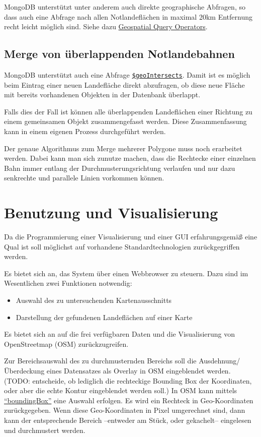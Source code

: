 \documentclass[
11pt, %
a4paper, %
oneside, %
pdfspacing, %
headinclude,
BCOR5mm, %
ngerman, %
bibtotocnumbered,
]{scrartcl}
\begin{document}
MongoDB unterstützt unter anderem auch direkte geographische Abfragen, so dass auch eine Abfrage nach allen Notlandeflächen in maximal 20km Entfernung recht leicht möglich sind. Siehe dazu \href{https://docs.mongodb.com/manual/reference/operator/query-geospatial/}{Geospatial Query Operators}.

\subsection{Merge von überlappenden Notlandebahnen}

MongoDB unterstützt auch eine Abfrage \href{https://docs.mongodb.com/manual/reference/operator/query/geoIntersects/#op._S_geoIntersects}{\texttt{\$geoIntersects}}. Damit ist es möglich beim Eintrag einer neuen Landefläche direkt abzufragen, ob diese neue Fläche mit bereits vorhandenen Objekten in der Datenbank überlappt. 

Falls dies der Fall ist können alle überlappenden Landeflächen einer Richtung zu einem gemeinsamen Objekt zusammengefasst werden. Diese Zusammenfassung kann in einem eigenen Prozess durchgeführt werden. 

Der genaue Algorithmus zum Merge mehrerer Polygone muss noch erarbeitet werden. Dabei kann man sich zunutze machen, dass die Rechtecke einer einzelnen Bahn immer entlang der Durchmusterungsrichtung verlaufen und nur dazu senkrechte und parallele Linien vorkommen können. 

\section{Benutzung und Visualisierung}

Da die Programmierung einer Visualisierung und einer GUI erfahrungsgemäß eine Qual ist soll möglichst auf vorhandene Standardtechnologien zurückgegriffen werden.

Es bietet sich an, das System über einen Webbrowser zu steuern. Dazu sind im Wesentlichen zwei Funktionen notwendig:
\begin{itemize}
	\item Auswahl des zu untersuchenden Kartenausschnitts
	\item Darstellung der gefundenen Landeflächen auf einer Karte
\end{itemize}

Es bietet sich an auf die frei verfügbaren Daten und die Visualisierung von OpenStreetmap (OSM) zurückzugreifen. 

Zur Bereichsauswahl des zu durchmusternden Bereichs soll die Ausdehnung/Überdeckung eines Datensatzes als Overlay in OSM eingeblendet werden. (TODO: entscheide, ob lediglich die rechteckige Bounding Box der Koordinaten, oder aber die echte Kontur eingeblendet werden soll.)
In OSM kann mittels \href{http://wiki.openstreetmap.org/wiki/Bounding_Box}{"`boundingBox"'} eine Auswahl erfolgen. Es wird ein Rechteck in Geo-Koordinaten zurückgegeben. Wenn diese Geo-Koordinaten in Pixel umgerechnet sind, dann kann der entsprechende Bereich –entweder am Stück, oder gekachelt– eingelesen und durchmustert werden. 
\end{document}
